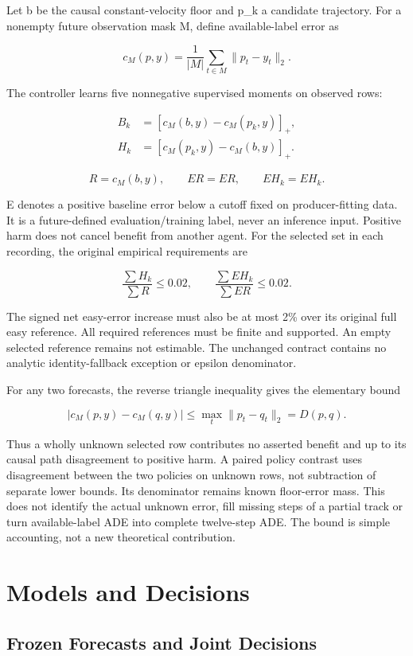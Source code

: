 \documentclass[10pt,twocolumn,letterpaper]{article}
\begin{document}
Let b be the causal constant-velocity floor and p\_k a candidate trajectory. For a nonempty future observation mask M, define available-label error as


\[
c_M(p,y)=\frac{1}{|M|}\sum_{t\in M}\|p_t-y_t\|_2.
\]

The controller learns five nonnegative supervised moments on observed rows:


\[
\begin{aligned}
B_k&=[c_M(b,y)-c_M(p_k,y)]_+,\\
H_k&=[c_M(p_k,y)-c_M(b,y)]_+.
\end{aligned}
\]

\[
R=c_M(b,y),\qquad ER=E R,\qquad EH_k=E H_k.
\]

E denotes a positive baseline error below a cutoff fixed on producer-fitting data. It is a future-defined evaluation/training label, never an inference input. Positive harm does not cancel benefit from another agent. For the selected set in each recording, the original empirical requirements are


\[
\frac{\sum H_k}{\sum R}\leq0.02,\qquad
\frac{\sum EH_k}{\sum ER}\leq0.02.
\]

The signed net easy-error increase must also be at most 2\% over its original full easy reference. All required references must be finite and supported. An empty selected reference remains not estimable. The unchanged contract contains no analytic identity-fallback exception or epsilon denominator.


For any two forecasts, the reverse triangle inequality gives the elementary bound


\[
|c_M(p,y)-c_M(q,y)|\leq\max_t\|p_t-q_t\|_2=D(p,q).
\]

Thus a wholly unknown selected row contributes no asserted benefit and up to its causal path disagreement to positive harm. A paired policy contrast uses disagreement between the two policies on unknown rows, not subtraction of separate lower bounds. Its denominator remains known floor-error mass. This does not identify the actual unknown error, fill missing steps of a partial track or turn available-label ADE into complete twelve-step ADE. The bound is simple accounting, not a new theoretical contribution.


\section{Models and Decisions}

\subsection{Frozen Forecasts and Joint Decisions}
\end{document}
